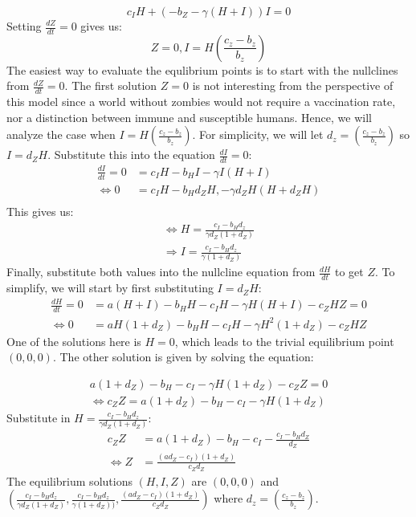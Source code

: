 \documentclass[
	12pt
]{article}
\begin{document}
\begin{equation}
c_IH+(-b_Z-\gamma(H+I))I = 0
\end{equation}
Setting $\frac{dZ}{dt}=0$ gives us:
\begin{equation}
Z=0, I = H \left(\frac{c_z-b_z}{b_z}\right)
\end{equation}
The easiest way to evaluate the equlibrium points is to start with the nullclines from $\frac{dZ}{dt}=0$. The first solution $Z=0$ is not interesting from the perspective of this model since a world without zombies would not require a vaccination rate, nor a distinction between immune and susceptible humans. Hence, we will analyze  the case when $I = H \left(\frac{c_z-b_z}{b_z}\right)$. For simplicity, we will let $d_z = \left(\frac{c_z-b_z}{b_z}\right)$ so $I=d_ZH$. Substitute this into the equation $\frac{dI}{dt}=0$:
			\begin{align*}
				\frac{dI}{dt}= 0 &=  c_IH-b_HI-\gamma I(H+I) \\
				\Leftrightarrow 0&= c_IH-b_Hd_ZH,-\gamma d_ZH(H+d_ZH)\\
			\end{align*}
This gives us:
			\begin{align*}
				\Leftrightarrow H=\frac{c_I-b_Hd_z}{\gamma d_Z(1+d_Z)}\\
				\Rightarrow I =  \frac{c_I-b_Hd_z}{\gamma (1+d_Z)} 
			\end{align*}
Finally, substitute both values into the nullcline equation from $\frac{dH}{dt}$ to get $Z$. To simplify, we will start by first substituting $I=d_ZH$:
			\begin{align*}
				\frac{dH}{dt} = 0 &= a(H+I)-b_HH-c_IH-\gamma H(H+I)-c_ZHZ=0\\
				\Leftrightarrow 0&= aH(1+d_Z)-b_HH-c_IH-\gamma H^2(1+d_Z)-c_ZHZ
			\end{align*}
One of the solutions here is $H=0$, which leads to the trivial equilibrium point $(0,0,0)$. The other solution is given by solving the equation:

\begin{align*}
a(1+d_Z)-b_H-c_I-\gamma H(1+d_Z)-c_ZZ = 0\\
\Leftrightarrow c_ZZ = a(1+d_Z)-b_H-c_I-\gamma H(1+d_Z)
\end{align*}
Substitute in $H=\frac{c_I-b_Hd_z}{\gamma d_Z(1+d_Z)}$:
\begin{align*}
c_ZZ&=a(1+d_Z)-b_H-c_I-\frac{c_I-b_Hd_Z}{d_Z}\\
\Leftrightarrow Z&=\frac{(ad_Z-c_I)(1+d_Z)}{c_Zd_Z}
\end{align*}
The equilibrium solutions $(H,I,Z)$ are $(0,0,0)$ and $(\frac{c_I-b_Hd_z}{\gamma d_Z(1+d_Z)},  \frac{c_I-b_Hd_z}{\gamma (1+d_Z))} , \frac{(ad_Z-c_I)(1+d_Z)}{c_Zd_Z})$ where $d_z = \left(\frac{c_z-b_z}{b_z}\right)$.
\end{document}
